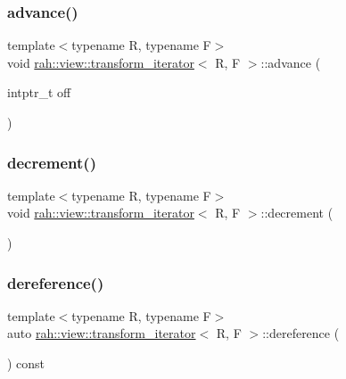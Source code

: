 \subsubsection{\texorpdfstring{advance()}{advance()}}
{\footnotesize\ttfamily template$<$typename R, typename F$>$ \\
void \mbox{\hyperlink{structrah_1_1view_1_1transform__iterator}{rah\+::view\+::transform\+\_\+iterator}}$<$ R, F $>$\+::advance (\begin{DoxyParamCaption}\item[{intptr\+\_\+t}]{off }\end{DoxyParamCaption})\hspace{0.3cm}{\ttfamily [inline]}}

\mbox{\label{structrah_1_1view_1_1transform__iterator_a05c99213d071102e793d57b967f7880d}} 
\subsubsection{\texorpdfstring{decrement()}{decrement()}}
{\footnotesize\ttfamily template$<$typename R, typename F$>$ \\
void \mbox{\hyperlink{structrah_1_1view_1_1transform__iterator}{rah\+::view\+::transform\+\_\+iterator}}$<$ R, F $>$\+::decrement (\begin{DoxyParamCaption}{ }\end{DoxyParamCaption})\hspace{0.3cm}{\ttfamily [inline]}}

\mbox{\label{structrah_1_1view_1_1transform__iterator_af72f5246736a89feca39293123a999e2}} 
\subsubsection{\texorpdfstring{dereference()}{dereference()}}
{\footnotesize\ttfamily template$<$typename R, typename F$>$ \\
auto \mbox{\hyperlink{structrah_1_1view_1_1transform__iterator}{rah\+::view\+::transform\+\_\+iterator}}$<$ R, F $>$\+::dereference (\begin{DoxyParamCaption}{ }\end{DoxyParamCaption}) const\hspace{0.3cm}{\ttfamily [inline]}}

